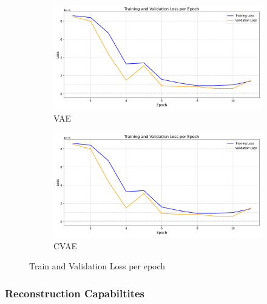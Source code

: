 \begin{figure}[!h]
  \begin{subfigure}[t]{.6\textwidth}
    \centering
    \includegraphics[width=\linewidth]{figures/losses/ae.png}
    \caption{VAE}
  \end{subfigure}
  \hfill
  \begin{subfigure}[t]{.6\textwidth}
    \centering
    \includegraphics[width=\linewidth]{figures/losses/ae.png}
    \caption{CVAE}
  \end{subfigure}
  \caption{Train and Validation Loss per epoch}
\end{figure}

\subsubsection{Reconstruction Capabiltites}

